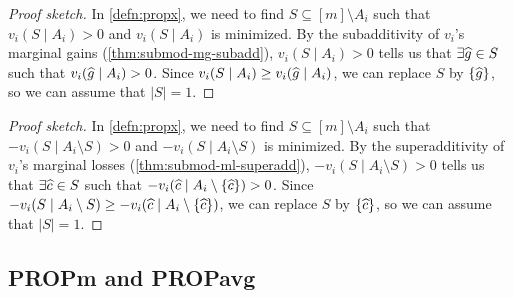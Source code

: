 \begin{proof}[Proof sketch]
In \cref{defn:propx}, we need to find $S \subseteq [m] \setminus A_i$ such that
$v_i(S \mid A_i) > 0$ and $v_i(S \mid A_i)$ is minimized.
By the subadditivity of $v_i$'s marginal gains (\cref{thm:submod-mg-subadd}),
$v_i(S \mid A_i) > 0$ tells us that $\exists \widehat{g} \in S$ such that $v_i(\widehat{g} \mid A_i) > 0$.
Since $v_i(S \mid A_i) \ge v_i(\widehat{g} \mid A_i)$, we can replace $S$ by $\{\widehat{g}\}$,
so we can assume \wLoG{} that $|S| = 1$.
\end{proof}

\begin{proof}[Proof sketch]
In \cref{defn:propx}, we need to find $S \subseteq [m] \setminus A_i$ such that
$-v_i(S \mid A_i \setminus S) > 0$ and $-v_i(S \mid A_i \setminus S)$ is minimized.
By the superadditivity of $v_i$'s marginal losses (\cref{thm:submod-ml-superadd}),
$-v_i(S \mid A_i \setminus S) > 0$ tells us that $\exists \widehat{c} \in S$ such that
$-v_i(\widehat{c} \mid A_i \setminus \{\widehat{c}\}) > 0$.
Since $-v_i(S \mid A_i \setminus S) \ge -v_i(\widehat{c} \mid A_i \setminus \{\widehat{c}\})$,
we can replace $S$ by $\{\widehat{c}\}$, so we can assume \wLoG{} that $|S| = 1$.
\end{proof}

\subsection{PROPm and PROPavg}
\label{sec:notions:propm-propavg}


